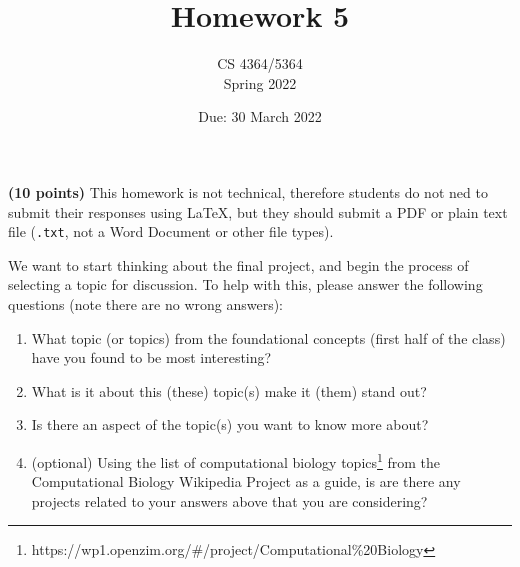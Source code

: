 \documentclass[11pt, oneside]{article}   	%
\title{Homework 5}
\author{CS 4364/5364\\Spring 2022}
\date{Due: 30 March 2022}							%
\begin{document}
\maketitle

\textbf{(10 points)} This homework is not technical, therefore students do not ned to submit their responses using \LaTeX, 
but they should submit a PDF or plain text file (\texttt{.txt}, not a Word Document or other file types). 

We want to start thinking about the final project, and begin the process of selecting a topic for discussion.
To help with this, please answer the following questions (note there are no wrong answers):

\begin{enumerate}
\item What topic (or topics) from the foundational concepts (first half of the class) have you found to be most interesting? 

\item What is it about this (these) topic(s) make it (them) stand out? 

\item Is there an aspect of the topic(s) you want to know more about? 

\item (optional) Using the list of computational biology topics\footnote{https://wp1.openzim.org/\#/project/Computational\%20Biology} from the Computational Biology Wikipedia Project as a guide, 
is are there any projects related to your answers above that you are considering? 

\end{enumerate}
\end{document}
